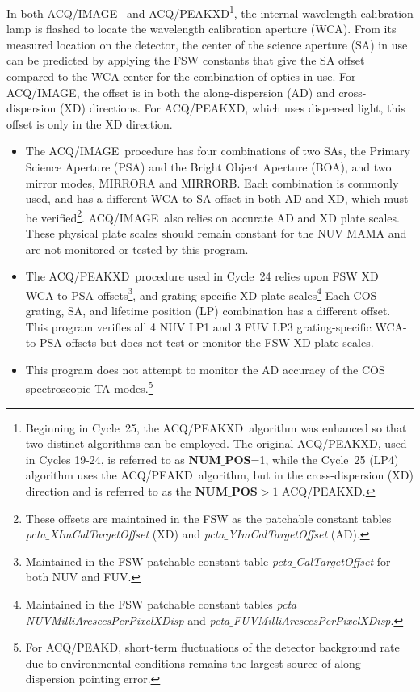 \documentclass[12pt]{reportj}
\newcommand*{\myfont}{\fontfamily{rm}\selectfont}
\def\numpos{{\bf NUM$\_$POS}\rm}
\def\acqimage{{\myfont ACQ/IMAGE}\rm}
\def\acqpeakd{{\myfont ACQ/PEAKD}\rm}
\def\acqpeakxd{{\myfont ACQ/PEAKXD}\rm}
\begin{document}
In both \acqimage~ and \acqpeakxd\footnote{Beginning in Cycle~25, the \acqpeakxd~algorithm was enhanced so that two distinct algorithms can be employed.
The original \acqpeakxd, used in Cycles 19-24, is referred to as \numpos=1, while the Cycle~25 (LP4) algorithm
uses the \acqpeakd~algorithm, but in the cross-dispersion (XD) direction and is referred to as the \numpos $ > 1$ \acqpeakxd.},
 the internal wavelength calibration lamp is flashed to locate the wavelength calibration aperture (WCA). From its measured location on the detector, the center of the science aperture (SA) in use can be predicted by applying the FSW constants that give the SA offset compared to the WCA center for the combination of optics in use.
For \acqimage, the offset is in both the along-dispersion (AD) and cross-dispersion (XD) directions. For \acqpeakxd, which uses dispersed light, this offset is only in the XD direction.
\begin{itemize}
\item{
The \acqimage~procedure has four combinations of two SAs, the Primary Science Aperture (PSA) and the Bright Object Aperture (BOA), and two mirror modes, MIRRORA and MIRRORB. Each combination is commonly used, and has a different WCA-to-SA offset in both AD and XD, which must be verified\footnote{These offsets are maintained in the FSW as the patchable constant tables {\it pcta$\_$XImCalTargetOffset} (XD) and {\it pcta$\_$YImCalTargetOffset} (AD).}. \acqimage~also relies on accurate AD and XD plate scales. These physical plate scales should remain constant for the NUV MAMA and are not monitored or tested by this program.
}
\item{
The \acqpeakxd~procedure used in Cycle~24 relies upon FSW XD WCA-to-PSA offsets\footnote{Maintained in the FSW patchable constant table {\it pcta$\_$CalTargetOffset} for both NUV and FUV.}, and grating-specific XD plate scales\footnote{Maintained in the FSW patchable constant tables {\it pcta$\_$NUVMilliArcsecsPerPixelXDisp} and {\it pcta$\_$FUVMilliArcsecsPerPixelXDisp}.}
Each COS grating, SA, and lifetime position (LP) combination has a different offset. This program verifies all 4 NUV LP1 and 3 FUV LP3 grating-specific WCA-to-PSA offsets but does not test or monitor the FSW XD plate scales.
}
\item{
This program does not attempt to monitor the AD accuracy of the COS spectroscopic TA modes.\footnote{For \acqpeakd, short-term fluctuations of the detector background rate due to environmental conditions remains the largest source of along-dispersion pointing error.}
}
\end{itemize}
\end{document}
